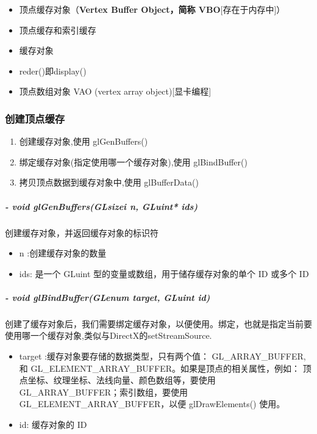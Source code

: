 \documentclass[UTF8,a4paper,8pt]{ctexbook}
\begin{document}
		\begin{itemize}
			\item  顶点缓存对象（\textbf{Vertex Buffer Object，简称 VBO}[存在于内存中]）
			\item  顶点缓存和索引缓存
			\item  缓存对象
			\item  reder()即display()
			\item 顶点数组对象 VAO (vertex array object)[显卡编程]
		\end{itemize}
		
		\subsubsection{创建顶点缓存}
			\begin{enumerate}
				\item 创建缓存对象,使用 glGenBuffers()
				\item 绑定缓存对象(指定使用哪一个缓存对象),使用 glBindBuffer()
				\item 拷贝顶点数据到缓存对象中,使用 glBufferData()
			\end{enumerate}
			
			\subparagraph{- void glGenBuffers(GLsizei n, GLuint* ids)}创建缓存对象，并返回缓存对象的标识符
				\begin{itemize}
					\item n :创建缓存对象的数量
					\item ids: 是一个 GLuint 型的变量或数组，用于储存缓存对象的单个 ID 或多个 ID
				\end{itemize}
				
			\subparagraph{- void glBindBuffer(GLenum target, GLuint id)}创建了缓存对象后，我们需要绑定缓存对象，以便使用。绑定，也就是指定当前要使用哪一个缓存对象,类似与DirectX的setStreamSource.
				\begin{itemize}
					\item target :缓存对象要存储的数据类型，只有两个值： GL\_ARRAY\_BUFFER, 和 GL\_ELEMENT\_ARRAY\_BUFFER。如果是顶点的相关属性，例如： 顶点坐标、纹理坐标、法线向量、颜色数组等，要使用 GL\_ARRAY\_BUFFER；索引数组，要使用 GL\_ELEMENT\_ARRAY\_BUFFER，以便 glDrawElements() 使用。
					
					\item id: 缓存对象的 ID
				\end{itemize}
			
\end{document}
